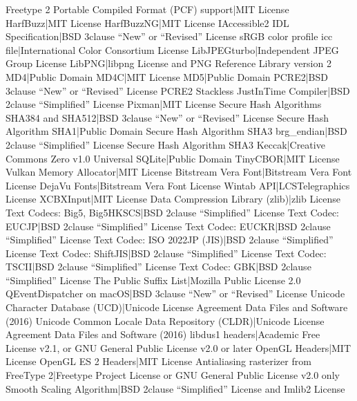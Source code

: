 \documentclass[letterpaper,10pt,english]{sphinxmanual}
\begin{document}
Freetype 2 \sphinxhyphen{} Portable Compiled Format (PCF) support|MIT License
HarfBuzz|MIT License
HarfBuzz\sphinxhyphen{}NG|MIT License
IAccessible2 IDL Specification|BSD 3\sphinxhyphen{}clause “New” or “Revised” License
sRGB color profile icc file|International Color Consortium License
LibJPEG\sphinxhyphen{}turbo|Independent JPEG Group License
LibPNG|libpng License and PNG Reference Library version 2
MD4|Public Domain
MD4C|MIT License
MD5|Public Domain
PCRE2|BSD 3\sphinxhyphen{}clause “New” or “Revised” License
PCRE2 \sphinxhyphen{} Stack\sphinxhyphen{}less Just\sphinxhyphen{}In\sphinxhyphen{}Time Compiler|BSD 2\sphinxhyphen{}clause “Simplified” License
Pixman|MIT License
Secure Hash Algorithms SHA\sphinxhyphen{}384 and SHA\sphinxhyphen{}512|BSD 3\sphinxhyphen{}clause “New” or “Revised” License
Secure Hash Algorithm SHA\sphinxhyphen{}1|Public Domain
Secure Hash Algorithm SHA\sphinxhyphen{}3 \sphinxhyphen{} brg\_endian|BSD 2\sphinxhyphen{}clause “Simplified” License
Secure Hash Algorithm SHA\sphinxhyphen{}3 \sphinxhyphen{} Keccak|Creative Commons Zero v1.0 Universal
SQLite|Public Domain
TinyCBOR|MIT License
Vulkan Memory Allocator|MIT License
Bitstream Vera Font|Bitstream Vera Font License
DejaVu Fonts|Bitstream Vera Font License
Wintab API|LCS\sphinxhyphen{}Telegraphics License
XCB\sphinxhyphen{}XInput|MIT License
Data Compression Library (zlib)|zlib License
Text Codecs: Big5, Big5\sphinxhyphen{}HKSCS|BSD 2\sphinxhyphen{}clause “Simplified” License
Text Codec: EUC\sphinxhyphen{}JP|BSD 2\sphinxhyphen{}clause “Simplified” License
Text Codec: EUC\sphinxhyphen{}KR|BSD 2\sphinxhyphen{}clause “Simplified” License
Text Codec: ISO 2022\sphinxhyphen{}JP (JIS)|BSD 2\sphinxhyphen{}clause “Simplified” License
Text Codec: Shift\sphinxhyphen{}JIS|BSD 2\sphinxhyphen{}clause “Simplified” License
Text Codec: TSCII|BSD 2\sphinxhyphen{}clause “Simplified” License
Text Codec: GBK|BSD 2\sphinxhyphen{}clause “Simplified” License
The Public Suffix List|Mozilla Public License 2.0
QEventDispatcher on macOS|BSD 3\sphinxhyphen{}clause “New” or “Revised” License
Unicode Character Database (UCD)|Unicode License Agreement \sphinxhyphen{} Data Files and Software (2016)
Unicode Common Locale Data Repository (CLDR)|Unicode License Agreement \sphinxhyphen{} Data Files and Software (2016)
libdus\sphinxhyphen{}1 headers|Academic Free License v2.1, or GNU General Public License v2.0 or later
OpenGL Headers|MIT License
OpenGL ES 2 Headers|MIT License
Anti\sphinxhyphen{}aliasing rasterizer from FreeType 2|Freetype Project License or GNU General Public License v2.0 only
Smooth Scaling Algorithm|BSD 2\sphinxhyphen{}clause “Simplified” License and Imlib2 License
\end{document}
